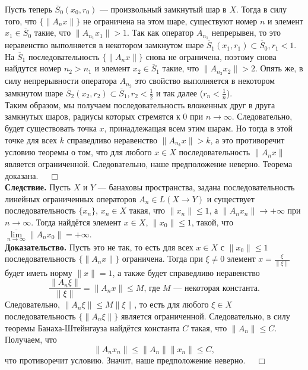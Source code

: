 \documentclass[12pt,a4paper, titlepage]{article}
\begin{document}
Пусть теперь $\overline{S}{}_0 (x_0, r_0)$ --- произвольный замкнутый шар в $X$. Тогда в силу того, что $\lbrace \|A_n x\| \rbrace$ не ограничена на этом шаре, существуют номер $n$ и элемент $x_1 \in \overline{S}{}_0$ такие, что $\|A_{n_1}x_1\| > 1$. Так как оператор $A_{n_1}$ непрерывен, то это неравенство выполняется в некотором замкнутом шаре $\overline{S}{}_1 (x_1, r_1) \subset \overline{S}{}_0, r_1 < 1$. На $\overline{S}{}_1$ последовательность $\lbrace \|A_n x\| \rbrace$ снова не ограничена, поэтому снова найдутся номер $n_2 > n_1$ и элемент $x_2 \in \overline{S}{}_1$ такие, что $\|A_{n_2}x_2\| > 2$. Опять же, в силу непрерывности оператора $A_{n_2}$ это свойство выполняется в некотором замкнутом шаре $\overline{S}{}_2 (x_2, r_2) \subset \overline{S}{}_1, r_2 < \frac12$ и так далее ($r_n < \frac1n$).\\

Таким образом, мы получаем последовательность вложенных друг в друга замкнутых шаров, радиусы которых стремятся к $0$ при $n\to\infty$. Следовательно, будет существовать точка $x$, принадлежащая всем этим шарам. Но тогда в этой точке для всех $k$ справедливо неравенство $\|A_{n_k}x\| > k$, а это противоречит условию теоремы о том, что для любого $x\in X$ последовательность $\|A_n x\|$ является ограниченной. Следовательно, наше предположение неверно. Теорема доказана. $\quad \Box$\\

\textbf{Следствие.} Пусть $X$ и $Y$ --- банаховы пространства, задана последовательность линейных ограниченных операторов $A_n \in L(X\to Y)$ и существует последовательность $\lbrace x_n \rbrace$, $x_n \in X$ такая, что $\|x_n\| \leqslant 1$, а $\|A_n x_n\| \to +\infty$ при $n\to\infty$. Тогда найдётся элемент $x \in X$, $\|x_0\| \leqslant 1$, такой, что $\overline{\lim\limits_{n\to\infty}} \|A_n x_0\| = +\infty$.\\
\textbf{Доказательство.} Пусть это не так, то есть для всех $x \in X$ с $\|x_0\| \leqslant 1$ последовательность $\lbrace \|A_n x\| \rbrace$ ограничена. Тогда при $\xi \neq 0$ элемент $x = \frac{\xi}{\|\xi\|}$ будет иметь норму $\|x\| = 1$, а также будет справедливо неравенство
$$
\frac{\|A_n\xi\|}{\|\xi\|} = \|A_n x\| \leqslant M \text{, где $M$ --- некоторая константа}.
$$
Следовательно, $\|A_n\xi\| \leqslant M \|\xi\|$, то есть для любого $\xi \in X$ последовательность $\lbrace \|A_n\xi\| \rbrace$ является ограниченной. Следовательно, в силу теоремы Банаха-Штейнгауза найдётся константа $C$ такая, что $\|A_n\| \leqslant C$. Получаем, что
$$
\|A_n x_n\| \leqslant \|A_n\| \|x_n\| \leqslant C,
$$
что противоречит условию. Значит, наше предположение неверно. $\quad \Box$\\
\end{document}
